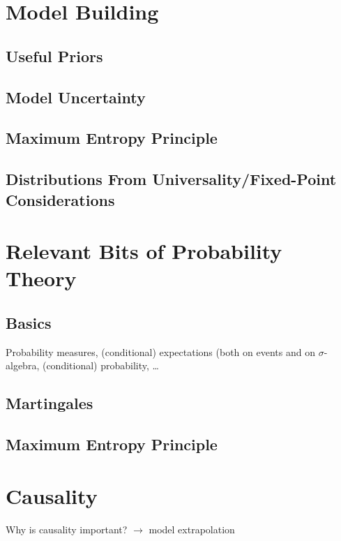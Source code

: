 \documentclass[11pt,reqno]{article}
\numberwithin{equation}{section}
\begin{document}
\section{Model Building}
\subsection{Useful Priors}

\subsection{Model Uncertainty}

\subsection{Maximum Entropy Principle}

\subsection{Distributions From Universality/Fixed-Point Considerations}

\appendix
\section{Relevant Bits of Probability Theory}
\subsection{Basics}
Probability measures, (conditional) expectations (both on events and on $\sigma$-algebra, (conditional) probability, \dots
\subsection{Martingales}
\subsection{Maximum Entropy Principle}
\section{Causality}
Why is causality important? $\rightarrow$ model extrapolation




{}

\end{document}
